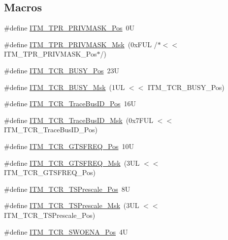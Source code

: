 \subsection*{Macros}
\begin{DoxyCompactItemize}
\item 
\#define \mbox{\hyperlink{group__CMSIS__ITM_ga7abe5e590d1611599df87a1884a352e8}{I\+T\+M\+\_\+\+T\+P\+R\+\_\+\+P\+R\+I\+V\+M\+A\+S\+K\+\_\+\+Pos}}~0U
\item 
\#define \mbox{\hyperlink{group__CMSIS__ITM_ga168e089d882df325a387aab3a802a46b}{I\+T\+M\+\_\+\+T\+P\+R\+\_\+\+P\+R\+I\+V\+M\+A\+S\+K\+\_\+\+Msk}}~(0x\+F\+U\+L /$\ast$$<$$<$ I\+T\+M\+\_\+\+T\+P\+R\+\_\+\+P\+R\+I\+V\+M\+A\+S\+K\+\_\+\+Pos$\ast$/)
\item 
\#define \mbox{\hyperlink{group__CMSIS__ITM_ga9174ad4a36052c377cef4e6aba2ed484}{I\+T\+M\+\_\+\+T\+C\+R\+\_\+\+B\+U\+S\+Y\+\_\+\+Pos}}~23U
\item 
\#define \mbox{\hyperlink{group__CMSIS__ITM_ga43ad7cf33de12f2ef3a412d4f354c60f}{I\+T\+M\+\_\+\+T\+C\+R\+\_\+\+B\+U\+S\+Y\+\_\+\+Msk}}~(1\+U\+L $<$$<$ I\+T\+M\+\_\+\+T\+C\+R\+\_\+\+B\+U\+S\+Y\+\_\+\+Pos)
\item 
\#define \mbox{\hyperlink{group__CMSIS__ITM_gaca0281de867f33114aac0636f7ce65d3}{I\+T\+M\+\_\+\+T\+C\+R\+\_\+\+Trace\+Bus\+I\+D\+\_\+\+Pos}}~16U
\item 
\#define \mbox{\hyperlink{group__CMSIS__ITM_ga60c20bd9649d1da5a2be8e656ba19a60}{I\+T\+M\+\_\+\+T\+C\+R\+\_\+\+Trace\+Bus\+I\+D\+\_\+\+Msk}}~(0x7\+F\+U\+L $<$$<$ I\+T\+M\+\_\+\+T\+C\+R\+\_\+\+Trace\+Bus\+I\+D\+\_\+\+Pos)
\item 
\#define \mbox{\hyperlink{group__CMSIS__ITM_ga96c7c7cbc0d98426c408090b41f583f1}{I\+T\+M\+\_\+\+T\+C\+R\+\_\+\+G\+T\+S\+F\+R\+E\+Q\+\_\+\+Pos}}~10U
\item 
\#define \mbox{\hyperlink{group__CMSIS__ITM_gade862cf009827f7f6748fc44c541b067}{I\+T\+M\+\_\+\+T\+C\+R\+\_\+\+G\+T\+S\+F\+R\+E\+Q\+\_\+\+Msk}}~(3\+U\+L $<$$<$ I\+T\+M\+\_\+\+T\+C\+R\+\_\+\+G\+T\+S\+F\+R\+E\+Q\+\_\+\+Pos)
\item 
\#define \mbox{\hyperlink{group__CMSIS__ITM_gad7bc9ee1732032c6e0de035f0978e473}{I\+T\+M\+\_\+\+T\+C\+R\+\_\+\+T\+S\+Prescale\+\_\+\+Pos}}~8U
\item 
\#define \mbox{\hyperlink{group__CMSIS__ITM_ga7a723f71bfb0204c264d8dbe8cc7ae52}{I\+T\+M\+\_\+\+T\+C\+R\+\_\+\+T\+S\+Prescale\+\_\+\+Msk}}~(3\+U\+L $<$$<$ I\+T\+M\+\_\+\+T\+C\+R\+\_\+\+T\+S\+Prescale\+\_\+\+Pos)
\item 
\#define \mbox{\hyperlink{group__CMSIS__ITM_ga7a380f0c8078f6560051406583ecd6a5}{I\+T\+M\+\_\+\+T\+C\+R\+\_\+\+S\+W\+O\+E\+N\+A\+\_\+\+Pos}}~4U

\end{DoxyCompactItemize}
